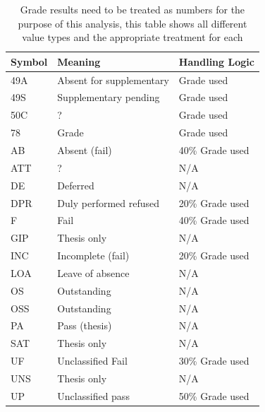 \begin{table}[]
    \centering
    \caption{Grade results need to be treated as numbers for the purpose of this analysis, this table shows all different value types and the appropriate treatment for each}
    \label{PercentTreatment}
    \begin{tabular}{lll}
        Symbol & Meaning                  & Handling Logic  \\ \hline
        49A    & Absent for supplementary & Grade used      \\
        49S    & Supplementary pending    & Grade used      \\
        50C    & ?                        & Grade used      \\
        78     & Grade                    & Grade used      \\
        AB     & Absent (fail)            & 40\% Grade used \\
        ATT    & ?                        & N/A             \\
        DE     & Deferred                 & N/A             \\
        DPR    & Duly performed refused   & 20\% Grade used \\
        F      & Fail                     & 40\% Grade used \\
        GIP    & Thesis only              & N/A             \\
        INC    & Incomplete (fail)        & 20\% Grade used \\
        LOA    & Leave of absence         & N/A             \\
        OS     & Outstanding              & N/A             \\
        OSS    & Outstanding              & N/A             \\
        PA     & Pass (thesis)            & N/A             \\
        SAT    & Thesis only              & N/A             \\
        UF     & Unclassified Fail        & 30\% Grade used \\
        UNS    & Thesis only              & N/A             \\
        UP     & Unclassified pass        & 50\% Grade used \\ \hline
    \end{tabular}
\end{table}